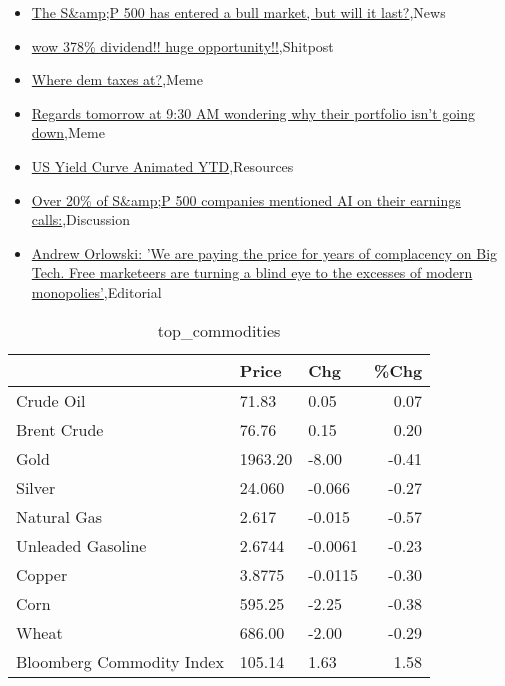 \documentclass{article}%
\begin{document}
%
\begin{itemize}%
\item%
\href{https://reddit.com/r/wallstreetbets/comments/14dcaw2/the\_sp\_500\_has\_entered\_a\_bull\_market\_but\_will\_it/}{The S\&amp;P 500 has entered a bull market, but will it last?},News%
\item%
\href{https://reddit.com/r/wallstreetbets/comments/14dauc6/wow\_378\_dividend\_huge\_opportunity/}{wow 378\% dividend!! huge opportunity!!},Shitpost%
\item%
\href{https://reddit.com/r/wallstreetbets/comments/14d6435/where\_dem\_taxes\_at/}{Where dem taxes at?},Meme%
\item%
\href{https://reddit.com/r/wallstreetbets/comments/14d36iw/regards\_tomorrow\_at\_930\_am\_wondering\_why\_their/}{Regards tomorrow at 9:30 AM wondering why their portfolio isn't going down},Meme%
\item%
\href{https://reddit.com/r/StockMarket/comments/14czc7r/us\_yield\_curve\_animated\_ytd/}{US Yield Curve Animated YTD},Resources%
\item%
\href{https://reddit.com/r/StockMarket/comments/14csb90/over\_20\_of\_sp\_500\_companies\_mentioned\_ai\_on\_their/}{Over 20\% of S\&amp;P 500 companies mentioned AI on their earnings calls:},Discussion%
\item%
\href{https://reddit.com/r/Economics/comments/14dav24/andrew\_orlowski\_we\_are\_paying\_the\_price\_for\_years/}{Andrew Orlowski: 'We are paying the price for years of complacency on Big Tech. Free marketeers are turning a blind eye to the excesses of modern monopolies'},Editorial%
\end{itemize}%


\begin{table}[htbp]%
\caption{top\_commodities}%
\centering%
\begin{adjustbox}{width=1\textwidth}%
\begin{tabular}{lllr}
\toprule
                          &   Price &     Chg &  \%Chg \\
\midrule
               Crude Oil  &   71.83 &    0.05 &  0.07 \\
             Brent Crude  &   76.76 &    0.15 &  0.20 \\
                    Gold  & 1963.20 &   -8.00 & -0.41 \\
                  Silver  &  24.060 &  -0.066 & -0.27 \\
             Natural Gas  &   2.617 &  -0.015 & -0.57 \\
       Unleaded Gasoline  &  2.6744 & -0.0061 & -0.23 \\
                  Copper  &  3.8775 & -0.0115 & -0.30 \\
                    Corn  &  595.25 &   -2.25 & -0.38 \\
                   Wheat  &  686.00 &   -2.00 & -0.29 \\
Bloomberg Commodity Index &  105.14 &    1.63 &  1.58 \\
\bottomrule
\end{tabular}
%
\end{adjustbox}%
\end{table}
\end{document}

